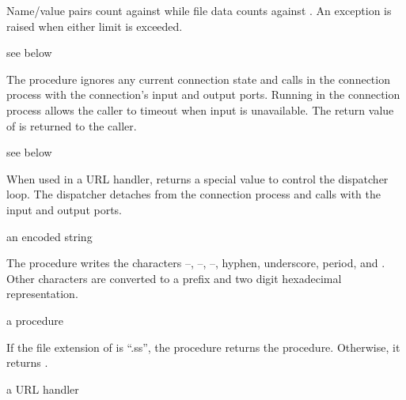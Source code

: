 Name/value pairs count against  while file data
counts against . An exception is raised when either
limit is exceeded.

\begin{procedure}
\end{procedure}
\returns {} see below

The  procedure ignores any current
connection state and calls  in the connection process with the
connection's input and output ports.  Running  in the
connection process allows the caller to timeout when input is
unavailable. The return value of  is returned to the caller.

\begin{procedure}
\end{procedure}
\returns {} see below

When used in a URL handler,  returns a
special value to control the dispatcher loop. The dispatcher detaches
from the connection process and calls  with the input and
output ports.

\begin{procedure}
\end{procedure}
\returns{} an encoded string

The  procedure writes the characters
--, --,
--, hyphen, underscore, period, and
\code{\~}. Other characters are converted to a \code{\%} prefix
and two digit hexadecimal representation.

\begin{procedure}
\end{procedure}
\returns{} a procedure \alt{} 

If the file extension of  is ``.ss'', the
 procedure returns the
 procedure. Otherwise, it returns
.

\begin{procedure}
\end{procedure}
\returns{} a URL handler

